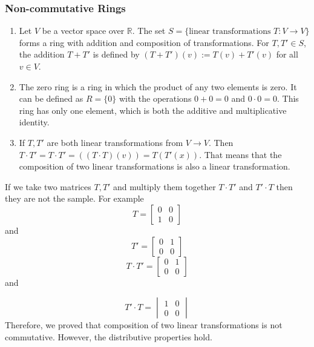 \documentclass[11pt, draft]{article}
\begin{document}
\subsubsection{Non-commutative Rings}
\begin{enumerate}
    \item Let \(V\) be a vector space over \(\mathbb{R}\). The set \(S = \{\text{linear
              transformations } T: V \to V\}\) forms a ring with addition and composition of
          transformations. For \(T, T' \in S\), the addition \(T + T'\) is defined by
          \((T + T')(v) := T(v) + T'(v)\) for all \(v \in V\).
    \item The zero ring is a ring in which the product of any two elements is zero. It
          can be defined as \( R = \{0\} \) with the operations \( 0 + 0 = 0 \) and \( 0
          \cdot 0 = 0 \). This ring has only one element, which is both the additive and
          multiplicative identity.
    \item If \(T, T'\) are both linear transformations from \(V \rightarrow V\). Then \(T \cdot T' = T \cdot T' = \left((T \cdot T)(v)  \right) = T(T'(x))\). That means that the composition of two linear transformations is also a linear transformation. 
\end{enumerate}
\begin{fact}
    If we take two matrices \(T, T'\) and multiply them together \(T \cdot T'\) and \(T' \cdot T\) then they are not the sample. For example
    \[T = \begin{bmatrix}
        0 & 0 \\    
1 & 0
    \end{bmatrix}\] and 
    \[T'=\begin{bmatrix}
        0 & 1 \\
        0 & 0
    \end{bmatrix}\]
    \[T \cdot T' = \begin{bmatrix}
        0 & 1 \\
        0 & 0
    \end{bmatrix}\] and

    \[T' \cdot T = \begin{vmatrix}
    1 & 0 \\
    0 & 0
    \end{vmatrix}\]
    Therefore, we proved that composition of two linear transformations is not commutative.
However, the distributive properties hold.
\end{fact}
\end{document}
